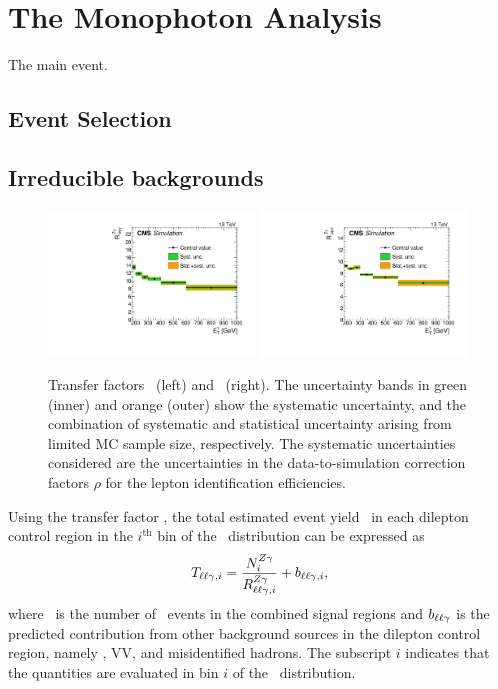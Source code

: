 \chapter{The Monophoton Analysis}
\label{chap:analysis}

The main event.

\section{Event Selection}
\label{sec:event_selection}

\section{Irreducible backgrounds}
\label{sec:irreducible}

\begin{figure}[htbp]
  \centering
    \includegraphics[width=0.49\textwidth]{Analysis/Figures/RZee.pdf}
    \includegraphics[width=0.49\textwidth]{Analysis/Figures/RZmm.pdf}
    \caption{
      Transfer factors \RZee\ (left) and \RZmm\ (right). 
      The uncertainty bands in green (inner) and orange (outer) show the systematic uncertainty, and the combination of systematic and statistical uncertainty arising from limited MC sample size, respectively. 
      The systematic uncertainties considered are the uncertainties in the data-to-simulation correction factors $\rho$ for the lepton identification efficiencies.
    }
    \label{fig:tf_z}
\end{figure}

Using the transfer factor \RZll, the total estimated event yield \Tll\ in each dilepton control region in the $i^\mathrm{th}$ bin of the \ETg\ distribution can be expressed as
\begin{equation}
  \Tll[,i] = \frac{\NZg[i]}{\RZll[,i]} + b_{\ell\ell\Pgg,i},
\end{equation}
where \NZg\ is the number of \zinvg\ events in the combined signal regions and $b_{\ell\ell\Pgg}$ is the predicted contribution from other background sources in the dilepton control region, namely \ttg, VV\Pgg, and misidentified hadrons. 
The subscript $i$ indicates that the quantities are evaluated in bin $i$ of the \ETg\ distribution.

